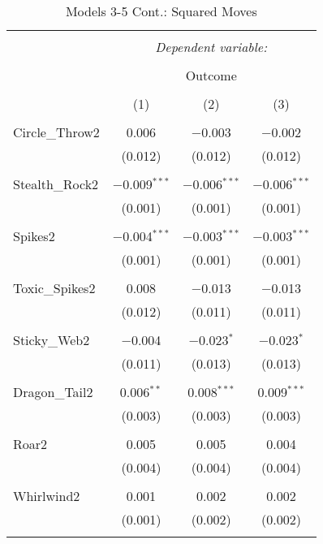 \documentclass[12pt,twoside]{reedthesis}
\begin{document}
  \begin{table}[!htbp] \centering 
    \caption{Models 3-5 Cont.: Squared Moves} 
    \label{} 
  \begin{tabular}{@{\extracolsep{5pt}}lccc} 
  \\[-1.8ex]\hline 
  \hline \\[-1.8ex] 
   & \multicolumn{3}{c}{\textit{Dependent variable:}} \\ 
  \cline{2-4} 
  \\[-1.8ex] & \multicolumn{3}{c}{Outcome} \\ 
  \\[-1.8ex] & (1) & (2) & (3)\\ 
  \hline \\[-1.8ex] 
   Circle\_Throw2 & 0.006 & $-$0.003 & $-$0.002 \\ 
    & (0.012) & (0.012) & (0.012) \\ 
    & & & \\ 
   Stealth\_Rock2 & $-$0.009$^{***}$ & $-$0.006$^{***}$ & $-$0.006$^{***}$ \\ 
    & (0.001) & (0.001) & (0.001) \\ 
    & & & \\ 
   Spikes2 & $-$0.004$^{***}$ & $-$0.003$^{***}$ & $-$0.003$^{***}$ \\ 
    & (0.001) & (0.001) & (0.001) \\ 
    & & & \\ 
   Toxic\_Spikes2 & 0.008 & $-$0.013 & $-$0.013 \\ 
    & (0.012) & (0.011) & (0.011) \\ 
    & & & \\ 
   Sticky\_Web2 & $-$0.004 & $-$0.023$^{*}$ & $-$0.023$^{*}$ \\ 
    & (0.011) & (0.013) & (0.013) \\ 
    & & & \\ 
   Dragon\_Tail2 & 0.006$^{**}$ & 0.008$^{***}$ & 0.009$^{***}$ \\ 
    & (0.003) & (0.003) & (0.003) \\ 
    & & & \\ 
   Roar2 & 0.005 & 0.005 & 0.004 \\ 
    & (0.004) & (0.004) & (0.004) \\ 
    & & & \\ 
   Whirlwind2 & 0.001 & 0.002 & 0.002 \\ 
    & (0.001) & (0.002) & (0.002) \\ 
    & & & \\ 

\end{tabular}
\end{table}
\end{document}
